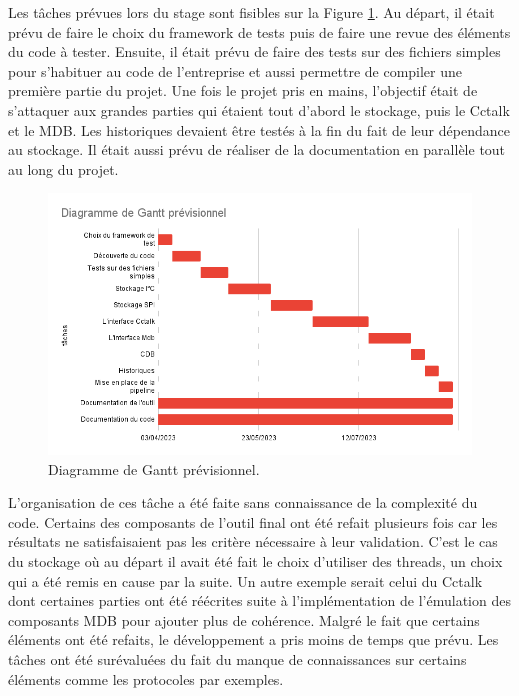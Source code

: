 \documentclass[a4paper]{article}
\begin{document}
Les tâches prévues lors du stage sont fisibles sur la Figure
\ref{fig:expectedgantt}. Au départ, il était prévu de faire le choix du
framework de tests puis de faire une revue des éléments du code à tester.
Ensuite, il était prévu de faire des tests sur des fichiers simples pour
s'habituer au code de l'entreprise et aussi permettre de compiler une première
partie du projet. Une fois le projet pris en mains, l'objectif était de
s'attaquer aux grandes parties qui étaient tout d'abord le stockage, puis le
Cctalk et le MDB. Les historiques devaient être testés à la fin du fait de leur
dépendance au stockage. Il était aussi prévu de réaliser de la documentation en
parallèle tout au long du projet.

\begin{figure}[h!]
  \begin{center}
  \includegraphics[scale=0.6]{./img/expected-gantt.png}
  \caption{Diagramme de Gantt prévisionnel.}
  \end{center}
  \label{fig:expectedgantt}
\end{figure}

L'organisation de ces tâche a été faite sans connaissance de la complexité du
code. Certains des composants de l'outil final ont été refait plusieurs fois car
les résultats ne satisfaisaient pas les critère nécessaire à leur validation.
C'est le cas du stockage où au départ il avait été fait le choix d'utiliser des
threads, un choix qui a été remis en cause par la suite. Un autre exemple serait
celui du Cctalk dont certaines parties ont été réécrites suite à
l'implémentation de l'émulation des composants MDB pour ajouter plus de
cohérence. Malgré le fait que certains éléments ont été refaits, le
développement a pris moins de temps que prévu. Les tâches ont été surévaluées du
fait du manque de connaissances sur certains éléments comme les protocoles par
exemples.
\end{document}
